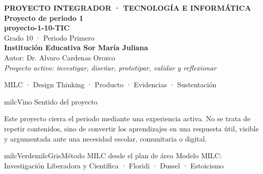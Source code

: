 \documentclass[11pt,letterpaper]{article}
\begin{document}
\thispagestyle{empty}

\vspace*{.85cm}
\begin{tcolorbox}[
  enhanced,colback=milcVino,colframe=milcVino,arc=12mm,width=.86\textwidth,
  boxrule=0pt,left=12mm,right=12mm,top=11mm,bottom=11mm,center,
  overlay={\draw[milcMagenta,line width=2pt,dash pattern=on 9pt off 8pt,rounded corners=10mm]
  ([xshift=7mm,yshift=-7mm]frame.north west) rectangle ([xshift=-7mm,yshift=7mm]frame.south east);}]
  \centering
  {\sffamily\bfseries\color{white}\fontsize{15}{17}\selectfont PROYECTO INTEGRADOR · TECNOLOGÍA E INFORMÁTICA}\\[1.0cm]
  {\sffamily\bfseries\color{white}\fontsize{30}{33}\selectfont Proyecto de periodo 1}\\[3mm]
  {\sffamily\bfseries\color{milcMostaza}\fontsize{25}{28}\selectfont proyecto-1-10-TIC}\\[8mm]
  {\sffamily\color{white}\Large Grado 10 · Periodo Primero}\\[1.0cm]
  {\sffamily\bfseries\color{white}\large Institución Educativa Sor María Juliana}\\[2mm]
  {\sffamily\color{white}Autor: Dr. Alvaro Cardenas Orozco}\\[4mm]
  {\sffamily\itshape\color{white}Proyecto activo: investigar, diseñar, prototipar, validar y reflexionar}
\end{tcolorbox}
\vfill
\begin{tcolorbox}[enhanced,colback=milcVino!72!black,colframe=milcVino!72!black,arc=5mm,boxrule=0pt,width=.86\textwidth,left=6mm,right=6mm,top=4mm,bottom=4mm,center]
{\color{white}\sffamily\small MILC · Design Thinking · Producto · Evidencias · Sustentación}
\end{tcolorbox}

\newpage
\begin{titlebox}{milcVino}
Sentido del proyecto
\end{titlebox}
\begin{multicols}{2}
Este proyecto cierra el periodo mediante una experiencia activa. No se trata de repetir contenidos, sino de convertir los aprendizajes en una respuesta útil, visible y argumentada ante una necesidad escolar, comunitaria o digital.

\columnbreak
\begin{softbox}{milcVerde}{milcGris}{Método MILC desde el plan de área}
Modelo MILC: Investigación Liberadora y Científica · Floridi · Dussel · Estoicismo
\end{softbox}
\end{multicols}
\end{document}
